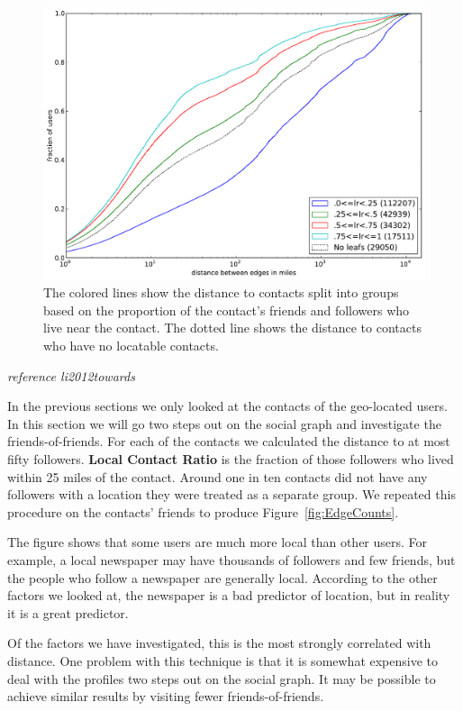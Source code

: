 \begin{figure}[tb]
\centering
\includegraphics[width=\linewidth]{figures/locals_10.pdf}
\caption{
The colored lines show the distance to contacts split into groups based on the
proportion of the contact's friends and followers who live near the contact.
The dotted line shows the distance to contacts who have no locatable contacts.
}
\label{fig:Local10}
\end{figure}

\emph{reference li2012towards}

In the previous sections we only looked at the contacts of the geo-located
users. In this section we will go two steps out on the social graph and
investigate the friends-of-friends.
%
For each of the contacts we calculated the distance to at most fifty followers.
%
\textbf{Local Contact Ratio} is the fraction of those followers who lived within 25 miles
of the contact.
%
Around one in ten contacts did not have any followers with a location they were
treated as a separate group.
%
We repeated this procedure on the contacts' friends to produce
Figure~\ref{fig:EdgeCounts}.

The figure shows that some users are much more local than other users.
For example, a local newspaper may have thousands of followers and few friends,
but the people who follow a newspaper are generally local.
According to the other factors we looked at, the newspaper is a bad predictor
of location, but in reality it is a great predictor.

Of the factors we have investigated, this is the most strongly correlated with
distance.
One problem with this technique is that it is somewhat expensive to deal with
the profiles two steps out on the social graph.
It may be possible to achieve similar results by visiting fewer
friends-of-friends.
